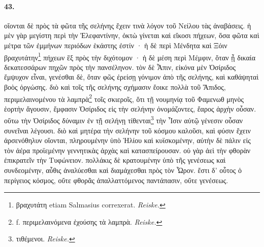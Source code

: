 \documentclass[a4paper, 11pt, oneside, polutonikogreek, german]{article}
\begin{document}
\paragraph{43.}
οἴονται δὲ πρὸς τὰ φῶτα τῆς σελήνης ἔχειν τινὰ λόγον τοῦ Νείλου τὰς ἀναβάσεις. ἡ μὲν γὰρ μεγίστη περὶ τὴν Ἐλεφαντίνην, ὀκτὼ γίνεται καὶ εἴκοσι πήχεων, ὅσα φῶτα καὶ μέτρα τῶν ἐμμήνων περιόδων ἑκάστης ἐστίν · ἡ δὲ περὶ Μένδητα καὶ Ξόιν βραχυτάτην\footnote{βραχυτάτη etiam Salmasius correxerat. \emph{Reiske.}} πήχεων ἓξ πρὸς τὴν διχότομον · ἡ δὲ μέση περὶ Μέμφιν, ὅταν ᾖ δικαία δεκατεσσάρων πηχῶν πρὸς τὴν πανσέληνον. τὸν δὲ Ἆπιν, εἰκόνα μὲν Ὀσίριδος ἔμψυχον εἶναι, γενέσθαι δὲ, ὅταν φῶς ἐρείσῃ γόνιμον ἀπὸ τῆς σελήνης, καὶ καθάψηταὶ βοὸς ὀργώσης. διὸ καὶ τοῖς τῆς σελήνης σχήμασιν ἔοικε πολλὰ τοῦ Ἄπιδος, περιμελαινομένου τὰ λαμπρὰ\footnote{f. περιμελαινόμενα ἐχούσης τὰ λαμπρὰ. \emph{Reiske.}} τοῖς σκιεροῖς, ὅτι τῇ νουμηνίᾳ τοῦ Φαμενωθ μηνὸς ἑορτὴν ἄγουσιν, ἔμφασιν Ὀσίριδος εἰς τὴν σελήνην ὀνομάζοντες, ἔαρος ἀρχὴν οὖσαν. οὕτω τὴν Ὀσίριδος δύναμιν ἐν τῇ σελήνῃ τίθενται\footnote{τιθέμενοι. \emph{Reiske.}} τὴν Ἶσιν αὐτῷ γένεσιν οὖσαν συνεῖναι λέγουσι. διὸ καὶ μητέρα τὴν σελήνην τοῦ κόσμου καλοῦσι, καὶ φύσιν ἔχειν ἀρσενόθηλυν οἴονται, πληρουμένην ὑπὸ Ἡλίου καὶ κυϊσκομένην, αὐτὴν δὲ πάλιν εἰς τὸν ἀέρα προϊεμένην γεννητικὰς ἀρχὰς καὶ κατασπείρουσαν. οὐ γὰρ ἀεὶ τὴν φθορὰν ἐπικρατεῖν τὴν Τυφώνειον. πολλάκις δὲ κρατουμένην ὑπὸ τῆς γενέσεως καὶ συνδεομένην, αὖθις ἀναλύεσθαι καὶ διαμάχεσθαι πρὸς τὸν Ὧρον. ἔστι δ' οὗτος ὁ περίγειος κόσμος, οὔτε φθορᾶς ἀπαλλαττόμενος παντάπασιν, οὔτε γενέσεως.
\end{document}
